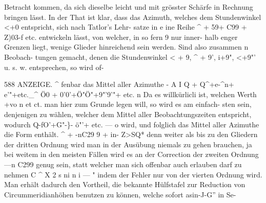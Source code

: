 \documentclass[12pt,a4paper]{article}
\begin{document}
Betracht kommen, da sich dieselbe leicht und mit grösster Schärfe in Rechnung bringen lässt. In der\newline
That ist klar, dass das Azimuth, welches dem Stundenwinkel <+0 entspricht, sich nach Tatlor's Lehr-\newline
satze in e ine Reihe \^{} + 59+ C99 + Z)03-f etc. entwickeln lässt, von welcher, in so fern 9 nur inner-\newline
halb enger Grenzen liegt, wenige Glieder hinreichend sein werden. Sind also zusammen n Beobach-\newline
tungen gemacht, denen die Stundenwinkel < + 9, \^{} + 9', i+9", <+9"' u. s. w. entsprechen, so wird of-\newline

\newpage
588 ANZEIGE. \^{}\newline
fenbar das Mittel aller Azimuthe\newline
- A I Q + Q\^{}+e-\^{}n+ e'"+etc.\_\^{}\newline
Ö0 + 0'0'+Ö"Ö"+9"'9'"+ etc.\newline
n\newline
Da es willkürlicli ist, welchen Werth +vo n et ct. man hier zum Grunde legen will, so wird es am einfach-\newline
sten sein, denjenigen zu wählen, welcher dem Mittel aller Beobachtungszeiten entspricht, wodurch\newline
Q-fO'+G"-\}- ö"'+ etc. --- o wird, und folglich das Mittel aller Azimuthe die Form enthält.\newline
\^{} + -nC29 9 + in- Z>SQ*\newline
denn weiter als bis zu den Gliedern der dritten Ordnung wird man in der Ausübung niemals zu gehen\newline
brauchen, ja bei weitem in den meisten Fällen wird es an der Correction der zweiten Ordnung ---n C299\newline
genug sein, statt welcher man sich offenbar auch erlauben darf zu nehmen C\newline
\^{}\newline
X 2 s ni n i\newline
--- "\newline
indem der Fehler nur von der vierten Ordnung wird. Man erhält dadurch den Vortheil, die bekannte\newline
Hülfstafel zur Reduction von Circummeridianhöhen benutzen zu können, welche sofort asin-J-G'' in Se-\newline
\end{document}
